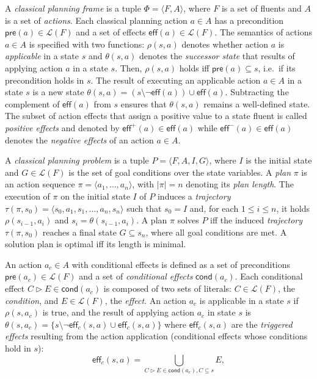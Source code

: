 \documentclass{article}
\newcommand{\tup}[1]{{\langle #1 \rangle}}
\newcommand{\pre}{\mathsf{pre}}     %
\newcommand{\eff}{\mathsf{eff}}     %
\newcommand{\cond}{\mathsf{cond}}   %
\begin{document}
A {\em classical planning frame} is a tuple $\Phi=\tup{F,A}$, where $F$ is a set of fluents and $A$ is a set of \emph{actions}. Each classical planning action $a\in A$ has a precondition $\pre(a)\in\mathcal{L}(F)$ and a set of effects $\eff(a)\in\mathcal{L}(F)$. The semantics of actions $a\in A$ is specified with two functions: $\rho(s,a)$ denotes whether action $a$ is {\em applicable} in a state $s$ and $\theta(s,a)$ denotes the {\em successor state} that results of applying action $a$ in a state $s$. Then, $\rho(s,a)$ holds iff $\pre(a)\subseteq s$, i.e.~if its precondition holds in $s$. The result of executing an applicable action $a\in A$ in a state $s$ is a new state $\theta(s,a)=(s\setminus \neg\eff(a))\cup\eff(a)$. Subtracting the complement of $\eff(a)$ from $s$ ensures that $\theta(s,a)$ remains a well-defined state. The subset of action effects that assign a positive value to a state fluent is called {\em positive effects} and denoted by $\eff^+(a)\in \eff(a)$ while $\eff^-(a)\in \eff(a)$ denotes the {\em negative effects} of an action $a\in A$.

A {\em classical planning problem} is a tuple $P=\tup{F,A,I,G}$, where $I$ is the initial state and $G\in\mathcal{L}(F)$ is the set of goal conditions over the state variables. A {\em plan} $\pi$ is an action sequence $\pi=\tup{a_1, \ldots, a_n}$, with $|\pi|=n$ denoting its {\em plan length}. The execution of $\pi$ on the initial state $I$ of $P$ induces a {\em trajectory} $\tau(\pi,s_0)=\tup{s_0, a_1, s_1, \ldots, a_n, s_n}$ such that $s_0=I$ and, for each {\small $1\leq i\leq n$}, it holds $\rho(s_{i-1},a_i)$ and $s_i=\theta(s_{i-1},a_i)$. A plan $\pi$ solves $P$ iff the induced {\em trajectory} $\tau(\pi,s_0)$ reaches a final state $G \subseteq s_n$, where all goal conditions are met. A solution plan is optimal iff its length is minimal.

An action $a_c\in A$ with conditional effects is defined as a set of preconditions $\pre(a_c)\in\mathcal{L}(F)$ and a set of {\em conditional effects} $\cond(a_c)$. Each conditional effect $C\rhd E\in\cond(a_c)$ is composed of two sets of literals: $C\in\mathcal{L}(F)$, the {\em condition}, and $E\in\mathcal{L}(F)$, the {\em effect}. An action $a_c$ is applicable in a state $s$ if $\rho(s,a_c)$ is true, and the result of applying action $a_c$ in state $s$ is $\theta(s,a_c)=\{s\setminus\neg\eff_c(s,a)\cup\eff_c(s,a)\}$ where $\eff_c(s,a)$ are the {\em triggered effects} resulting from the action application (conditional effects whose conditions hold in $s$):
\[
\eff_c(s,a)=\bigcup_{C\rhd E\in\cond(a_c),C\subseteq s} E,
\]
\end{document}
